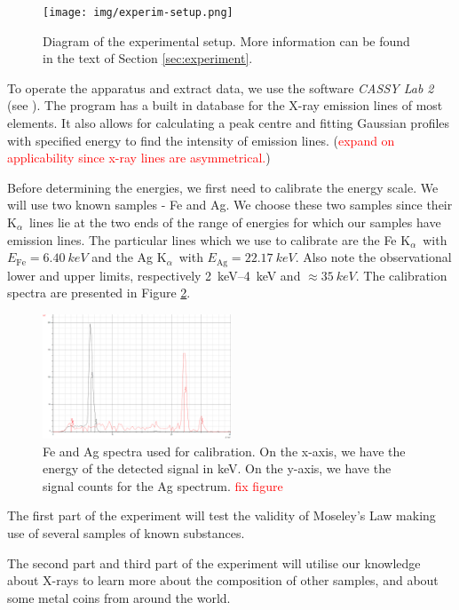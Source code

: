\documentclass[11pt,a4paper,twoside,onecolumn]{article}
\newcommand{\reminder}[1]{\textcolor{red}{#1}}
\newcommand{\Kalpha}{$\mathrm{K}_\alpha$~}
\begin{document}
\begin{figure}[!htbp]
    \centering
    \texttt{[image: img/experim-setup.png]}
    \caption{Diagram of the experimental setup. More information can be found in the text of Section \ref{sec:experiment}.}\label{fig:experim-setup}
\end{figure}

To operate the apparatus and extract data, we use the software \emph{CASSY Lab 2} (see \cite{cassylab2}). The program has a built in database for the X-ray emission lines of most elements. It also allows for calculating a peak centre and fitting Gaussian profiles with specified energy to find the intensity of emission lines. (\reminder{expand on applicability since x-ray lines are asymmetrical.})

Before determining the energies, we first need to calibrate the energy scale. We will use two known samples - Fe and Ag. We choose these two samples since their \Kalpha lines lie at the two ends of the range of energies for which our samples have emission lines. The particular lines which we use to calibrate are the Fe \Kalpha with $E_\mathrm{Fe} = \qty{6.40}{keV}$ and the Ag \Kalpha with $E_\mathrm{Ag} = \qty{22.17}{keV}$. Also note the observational lower and upper limits, respectively \qtyrange{2}{4}{keV} and $\approx \qty{35}{keV}$. The calibration spectra are presented in Figure \ref{fig:calibration}.

\begin{figure}[!htbp]
    \centering
    \includegraphics[width=0.5\textwidth]{img/calib.png}
    \caption{Fe and Ag spectra used for calibration. On the x-axis, we have the energy of the detected signal in \unit{keV}. On the y-axis, we have the signal counts for the Ag spectrum. \reminder{fix figure}}\label{fig:calibration}
\end{figure}

The first part of the experiment will test the validity of Moseley's Law making use of several samples of known substances.

The second part and third part of the experiment will utilise our knowledge about X-rays to learn more about the composition of other samples, and about some metal coins from around the world.
\end{document}
